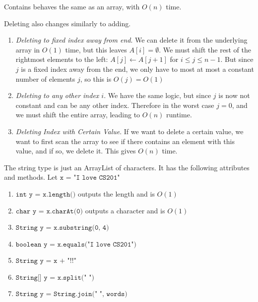   \begin{algo}
    Contains behaves the same as an array, with $O(n)$ time. 
  \end{algo} 

  \begin{algo}
    Deleting also changes similarly to adding. 
    \begin{enumerate}
      \item \textit{Deleting to fixed index away from end}. We can delete it from the underlying array in $O(1)$ time, but this leaves $A[i] = \emptyset$. We must shift the rest of the rightmost elements to the left: $A[j] \gets A[j+1]$ for $i \leq j \leq n-1$. But since $j$ is a fixed index away from the end, we only have to most at most a constant number of elements $j$, so this is $O(j) = O(1)$
      \item \textit{Deleting to any other index $i$}. We have the same logic, but since $j$ is now not constant and can be any other index. Therefore in the worst case $j = 0$, and we must shift the entire array, leading to $O(n)$ runtime. 
      \item \textit{Deleting Index with Certain Value}. If we want to delete a certain value, we want to first scan the array to see if there contains an element with this value, and if so, we delete it. This gives $O(n)$ time.  
    \end{enumerate}
  \end{algo} 

  \begin{example}[String]
    \label{ex:string}
    The string type is just an ArrayList of characters. It has the following attributes and methods. Let $\texttt{x = "I love CS201"}$ 
    \begin{enumerate}
      \item $\texttt{int y = x.length()}$ outputs the length and is $O(1)$ 
      \item $\texttt{char y = x.charAt(0)}$ outputs a character and is $O(1)$
      \item $\texttt{String y = x.substring(0, 4)}$ 
      \item $\texttt{boolean y = x.equals("I love CS201")}$
      \item $\texttt{String y = x + "!!"}$ 
      \item $\texttt{String[] y = x.split(" ")}$
      \item $\texttt{String y = String.join(" ", words)}$
    \end{enumerate}
  \end{example} 

